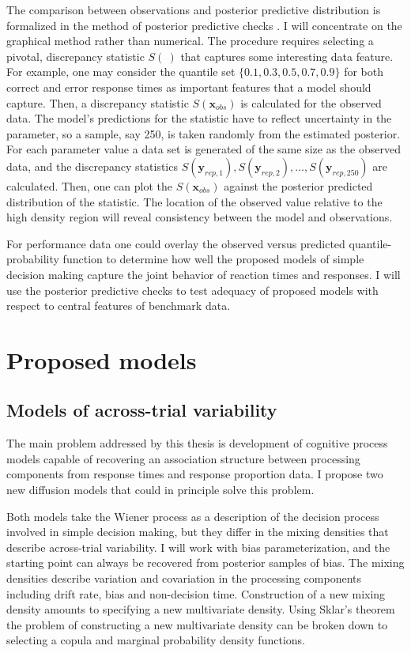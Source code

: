 \documentclass[12pt]{article}
\begin{document}
	The comparison between observations and posterior predictive distribution is formalized in the method of posterior predictive checks \citep{GelGoe2000,GelCar2013}. I will concentrate on the graphical method rather than numerical. The procedure requires selecting a pivotal, discrepancy statistic $S(\:)$ that captures some interesting data feature. For example, one may consider the quantile set $\{0.1, 0.3, 0.5, 0.7, 0.9\}$ for both correct and error response times as important features that a model should capture. Then, a discrepancy statistic $S(\boldsymbol{x}_{obs})$ is calculated for the observed data. The model’s predictions for the statistic have to reflect uncertainty in the parameter, so a sample, say 250, is taken randomly from the estimated posterior. For each parameter value a data set is generated of the same size as the observed data, and the discrepancy statistics $S(\boldsymbol{y}_{rep,1}), S(\boldsymbol{y}_{rep,2}), \dots, S(\boldsymbol{y}_{rep,250})$  are calculated. Then, one can plot the $S(\boldsymbol{x}_{obs})$ against the posterior predicted distribution of the statistic. The location of the observed value relative to the high density region will reveal consistency between the model and observations. 
    
	For performance data one could overlay the observed versus predicted quantile-probability function to determine how well the proposed models of simple decision making capture the joint behavior of reaction times and responses. I will use the posterior predictive checks to test adequacy of proposed models with respect to central features of benchmark data.


\section{Proposed models}
\subsection{Models of across-trial variability}
	The main problem addressed by this thesis is development of cognitive process models capable of recovering an association structure between processing components from response times and response proportion data. I propose two new diffusion models that could in principle solve this problem. 

	Both models take the Wiener process as a description of the decision process involved in simple decision making, but they differ in the mixing densities that describe across-trial variability. I will work with bias parameterization, and the starting point can always be recovered from posterior samples of bias. The mixing densities describe variation and covariation in the processing components including drift rate, bias and non-decision time. Construction of a new mixing density amounts to specifying a new multivariate density. Using Sklar’s theorem the problem of constructing a new multivariate density can be broken down to selecting a copula and marginal probability density functions.
    
\end{document}
